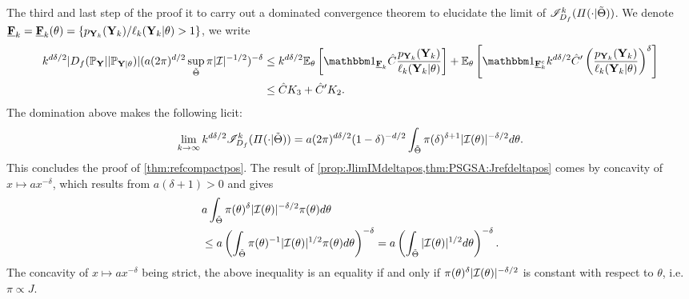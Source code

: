 \begin{proofb}
The third and last step of the proof it to carry out a dominated convergence theorem to elucidate the limit of $\mathscr{I}_{D_f}^k(\varPi(\cdot|\tilde\Theta))$.
We denote $\underline{\mathbf{F}}_k= \underline{\mathbf{F}}_k(\theta)=\{p_{\mathbf{Y}_k}(\mathbf{Y}_k)/\ell_k(\mathbf{Y}_k|\theta)>1\}$, %
    we write
    \begin{align}
\nonumber       k^{d\delta/2}|D_f(\PP_{\mbf Y}||\PP_{\mbf Y|\theta}) | (a(2\pi)^{d/2}\sup_{\tilde\Theta}\pi|\cI|^{-1/2})^{-\delta}  
    &\leq k^{d\delta/2}\EE_\theta\left[\indic_{\ubf F_k}\hat C\frac{p_{\mbf Y_k}(\mbf Y_k)}{\ell_k(\mbf Y_k|\theta)}\right] + \EE_\theta\left[\indic_{\ubf F_k^c}k^{d\delta/2}\hat C'\left(\frac{p_{\mbf Y_k}(\mbf Y_k)}{\ell_k(\mbf Y_k|\theta)}\right)^\delta \right] \\
                &\leq\hat CK_3 + \hat C'K_2. %
    \end{align}
The domination above makes the following licit:
    \begin{equation}
        \lim_{k\rightarrow\infty} k^{d\delta/2}\mathscr{I}^k_{D_f}(\varPi(\cdot|\tilde\Theta))  = a(2\pi)^{d\delta/2}(1-\delta)^{-d/2} \int_{\tilde\Theta}\pi(\delta)^{\delta+1}|\mathcal{I}(\theta)|^{-\delta/2}d\theta.
    \end{equation}
This concludes the proof of \cref{thm:refcompactpos}. The result of \cref{prop:JlimIMdeltapos,thm:PSGSA:Jrefdeltapos} comes by 
concavity of $x\mapsto a x^{-\delta}$, which results from $a(\delta+1)>0$ and  gives
    \begin{align}
    \nonumber
        &a \int_{\tilde\Theta}\pi(\theta)^\delta |\mathcal{I}(\theta)|^{-\delta/2}\pi(\theta)d\theta \\
            &\leq a\left(\int_{\tilde\Theta}\pi(\theta)^{-1}|\mathcal{I}(\theta)|^{1/2}\pi(\theta)d\theta\right)^{-\delta}
            = a \left(\int_{\tilde\Theta} |\mathcal{I}(\theta)|^{1/2} d\theta\right)^{-\delta}. \label{eq:concavinequality}
    \end{align}
The concavity of $x\mapsto a x^{-\delta}$ being strict, the above inequality is an equality if and only if 
$\pi(\theta)^\delta|\mathcal{I}(\theta)|^{-\delta/2}$ is constant with respect to  $\theta$, i.e. $\pi\propto J$.

\end{proofb}


